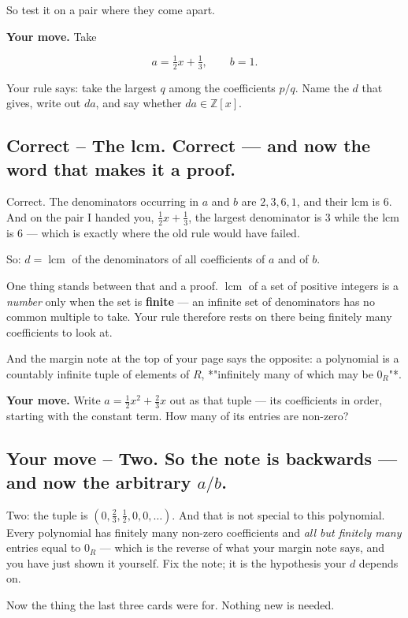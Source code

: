 \documentclass[11pt]{article}
\begin{document}
So test it on a pair where they come apart.

\textbf{Your move.} Take

$$a = \tfrac{1}{2}x + \tfrac{1}{3}, \qquad b = 1 .$$

Your rule says: take the largest $q$ among the coefficients $p/q$. Name the $d$ that gives, write out $da$, and say whether $da \in \mathbb{Z}[x]$.


\subsection*{Correct -- The lcm. Correct --- and now the word that makes it a proof.}
Correct. The denominators occurring in $a$ and $b$ are $2, 3, 6, 1$, and their lcm is $6$. And on the pair I handed you, $\tfrac12 x + \tfrac13$, the largest denominator is $3$ while the lcm is $6$ --- which is exactly where the old rule would have failed.

So: $d = \operatorname{lcm}$ of the denominators of all coefficients of $a$ and of $b$.

One thing stands between that and a proof. $\operatorname{lcm}$ of a set of positive integers is a \emph{number} only when the set is \textbf{finite} --- an infinite set of denominators has no common multiple to take. Your rule therefore rests on there being finitely many coefficients to look at.

And the margin note at the top of your page says the opposite: a polynomial is a countably infinite tuple of elements of $R$, *"infinitely many of which may be $0_R$"*.

\textbf{Your move.} Write $a = \tfrac{1}{2}x^{2} + \tfrac{2}{3}x$ out as that tuple --- its coefficients in order, starting with the constant term. How many of its entries are non-zero?


\subsection*{Your move -- Two. So the note is backwards --- and now the arbitrary $a/b$.}
Two: the tuple is $(0, \tfrac23, \tfrac12, 0, 0, \ldots)$. And that is not special to this polynomial. Every polynomial has finitely many non-zero coefficients and \emph{all but finitely many} entries equal to $0_R$ --- which is the reverse of what your margin note says, and you have just shown it yourself. Fix the note; it is the hypothesis your $d$ depends on.

Now the thing the last three cards were for. Nothing new is needed.
\end{document}
